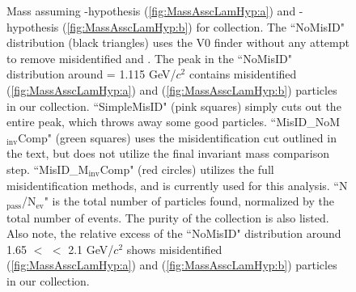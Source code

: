 \documentclass[../AnalysisNoteJBuxton.tex]{subfiles}
\begin{document}
\begin{figure}[h!]
  \centering
  \caption[\LamALam contamination in \Ks collection]{Mass assuming \Lam-hypothesis (\ref{fig:MassAsscLamHyp:a}) and \ALam-hypothesis (\ref{fig:MassAsscLamHyp:b}) for \Ks collection.
  The ``NoMisID" distribution (black triangles) uses the V0 finder without any attempt to remove misidentified \Lam and \ALam.
  The peak in the ``NoMisID" distribution around \minv = 1.115 GeV/$c^{2}$ contains misidentified \Lam (\ref{fig:MassAsscLamHyp:a}) and \ALam (\ref{fig:MassAsscLamHyp:b}) particles in our \Ks collection.  
  ``SimpleMisID" (pink squares) simply cuts out the entire peak, which throws away some good \Ks particles.
  ``MisID\_NoM$_{\mathrm{inv}}$Comp" (green squares) uses the misidentification cut outlined in the text, but does not utilize the final invariant mass comparison step.
  ``MisID\_M$_{\mathrm{inv}}$Comp" (red circles) utilizes the full misidentification methods, and is currently used for this analysis.
  ``N$_{\mathrm{pass}}$/N$_{\mathrm{ev}}$" is the total number of \Ks particles found, normalized by the total number of events.  The purity of the collection is also listed. 
  Also note, the relative excess of the ``NoMisID" distribution around 1.65 $<$ \minv $<$ 2.1 GeV/$c^{2}$ shows misidentified \ALam (\ref{fig:MassAsscLamHyp:a}) and \Lam (\ref{fig:MassAsscLamHyp:b}) particles in our \Ks collection.}
  \label{fig:MassAsscLamHyp}
\end{figure}
\end{document}
